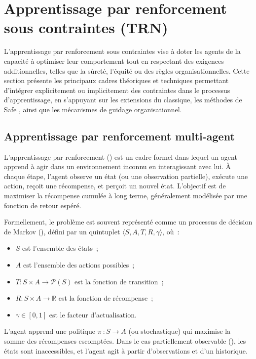 \section{Apprentissage par renforcement sous contraintes (TRN)}

L'apprentissage par renforcement sous contraintes vise à doter les agents de la capacité à optimiser leur comportement tout en respectant des exigences additionnelles, telles que la sûreté, l'équité ou des règles organisationnelles. Cette section présente les principaux cadres théoriques et techniques permettant d'intégrer explicitement ou implicitement des contraintes dans le processus d'apprentissage, en s'appuyant sur les extensions du  classique, les méthodes de Safe , ainsi que les mécanismes de guidage organisationnel.

\subsection{Apprentissage par renforcement multi-agent}

L'apprentissage par renforcement () est un cadre formel dans lequel un agent apprend à agir dans un environnement inconnu en interagissant avec lui. À chaque étape, l'agent observe un état (ou une observation partielle), exécute une action, reçoit une récompense, et perçoit un nouvel état. L'objectif est de maximiser la récompense cumulée à long terme, généralement modélisée par une fonction de retour espéré.

Formellement, le problème est souvent représenté comme un processus de décision de Markov (), défini par un quintuplet $\langle S, A, T, R, \gamma \rangle$, où~:
\begin{itemize}
  \item $S$ est l'ensemble des états~;
  \item $A$ est l'ensemble des actions possibles~;
  \item $T: S \times A \rightarrow \mathcal{P}(S)$ est la fonction de transition~;
  \item $R: S \times A \rightarrow \mathbb{R}$ est la fonction de récompense~;
  \item $\gamma \in [0,1]$ est le facteur d'actualisation.
\end{itemize}

L'agent apprend une politique $\pi~: S \rightarrow A$ (ou stochastique) qui maximise la somme des récompenses escomptées. Dans le cas partiellement observable (), les états sont inaccessibles, et l'agent agit à partir d'observations et d'un historique.


